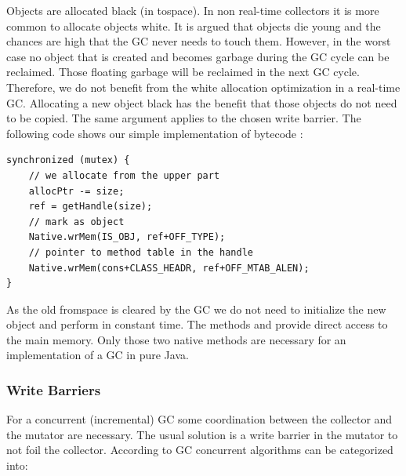 Objects are allocated black (in tospace). In non real-time
collectors it is more common to allocate objects white. It is argued
\cite{gc:dijkstra78} that objects die young and the chances are high
that the GC never needs to touch them. However, in the worst case no
object that is created and becomes garbage during the GC cycle can
be reclaimed. Those floating garbage will be reclaimed in the next
GC cycle. Therefore, we do not benefit from the white allocation
optimization in a real-time GC. Allocating a new object black has
the benefit that those objects do not need to be copied. The same
argument applies to the chosen write barrier. The following code
shows our simple implementation of bytecode :

\begin{samepage}
\begin{lstlisting}
synchronized (mutex) {
    // we allocate from the upper part
    allocPtr -= size;
    ref = getHandle(size);
    // mark as object
    Native.wrMem(IS_OBJ, ref+OFF_TYPE);
    // pointer to method table in the handle
    Native.wrMem(cons+CLASS_HEADR, ref+OFF_MTAB_ALEN);
}
\end{lstlisting}
\end{samepage}

As the old fromspace is cleared by the GC we do not need to
initialize the new object and perform  in constant time.
The methods  and  provide
direct access to the main memory. Only those two native methods are
necessary for an implementation of a GC in pure Java.

\subsubsection{Write Barriers}

For a concurrent (incremental) GC some coordination between the
collector and the mutator are necessary. The usual solution is a
write barrier in the mutator to not foil the collector. According to
\cite{gc:wils94} GC concurrent algorithms can be categorized into:

